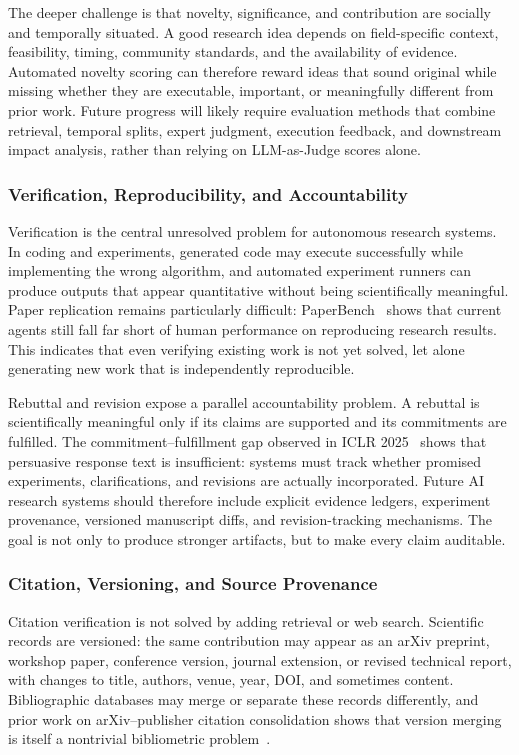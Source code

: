 \documentclass{llmxive}
\begin{document}
The deeper challenge is that novelty, significance, and contribution are socially and temporally situated. A good research idea depends on field-specific context, feasibility, timing, community standards, and the availability of evidence. Automated novelty scoring can therefore reward ideas that sound original while missing whether they are executable, important, or meaningfully different from prior work. Future progress will likely require evaluation methods that combine retrieval, temporal splits, expert judgment, execution feedback, and downstream impact analysis, rather than relying on LLM-as-Judge scores alone.


\subsubsection{Verification, Reproducibility, and Accountability}

Verification is the central unresolved problem for autonomous research systems. In coding and experiments, generated code may execute successfully while implementing the wrong algorithm, and automated experiment runners can produce outputs that appear quantitative without being scientifically meaningful. Paper replication remains particularly difficult: PaperBench~\cite{paperbench2025} shows that current agents still fall far short of human performance on reproducing research results. This indicates that even verifying existing work is not yet solved, let alone generating new work that is independently reproducible.

Rebuttal and revision expose a parallel accountability problem. A rebuttal is scientifically meaningful only if its claims are supported and its commitments are fulfilled. The commitment--fulfillment gap observed in ICLR 2025~\cite{rebuttalcommitment2026} shows that persuasive response text is insufficient: systems must track whether promised experiments, clarifications, and revisions are actually incorporated. Future AI research systems should therefore include explicit evidence ledgers, experiment provenance, versioned manuscript diffs, and revision-tracking mechanisms. The goal is not only to produce stronger artifacts, but to make every claim auditable.


\subsubsection{Citation, Versioning, and Source Provenance}

Citation verification is not solved by adding retrieval or web search. Scientific records are versioned: the same contribution may appear as an arXiv preprint, workshop paper, conference version, journal extension, or revised technical report, with changes to title, authors, venue, year, DOI, and sometimes content. Bibliographic databases may merge or separate these records differently, and prior work on arXiv--publisher citation consolidation shows that version merging is itself a nontrivial bibliometric problem~\cite{gao2020arxivcitationmerging}.
\end{document}

